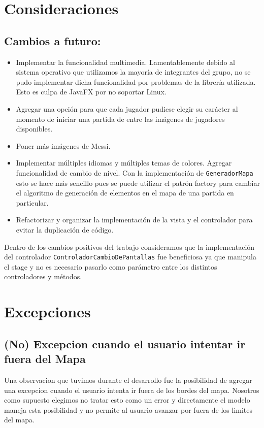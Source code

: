\documentclass[titlepage,a4paper]{article}
\begin{document}
\section{Consideraciones}
\label{sec:orgc8bc516}

\subsection{Cambios a futuro:}
\label{sec:org87ab3e0}

\begin{itemize}
\item Implementar la funcionalidad multimedia. Lamentablemente debido al
sistema operativo que utilizamos la mayoría de integrantes del grupo,
no se pudo implementar dicha funcionalidad por problemas de la
librería utilizada. Esto es culpa de JavaFX por no soportar Linux.

\item Agregar una opción para que cada jugador pudiese elegir su carácter al
momento de iniciar una partida de entre las imágenes de jugadores
disponibles.

\item Poner más imágenes de Messi.

\item Implementar múltiples idiomas y múltiples temas de colores.
Agregar funcionalidad de cambio de nivel. Con la implementación de
\texttt{GeneradorMapa} esto se hace más sencillo pues se puede utilizar el
patrón factory para cambiar el algoritmo de generación de elementos en
el mapa de una partida en particular.

\item Refactorizar y organizar la implementación de la vista y el
controlador para evitar la duplicación de código.
\end{itemize}

Dentro de los cambios positivos del trabajo consideramos que la
implementación del controlador \texttt{ControladorCambioDePantallas} fue
beneficiosa ya que manipula el stage y no es necesario pasarlo como
parámetro entre los distintos controladores y métodos.

\section{Excepciones}
\label{sec:orgd046f7d}
\subsection{(No) Excepcion cuando el usuario intentar ir fuera del Mapa}
\label{sec:org45cdac0}

Una observacion que tuvimos durante el desarrollo fue la posibilidad
de agregar una excepcion cuando el usuario intenta ir fuera de los
bordes del mapa. Nosotros como supuesto elegimos no tratar esto como
un error y directamente el modelo maneja esta posibilidad y no permite
al usuario avanzar por fuera de los limites del mapa.
\end{document}

